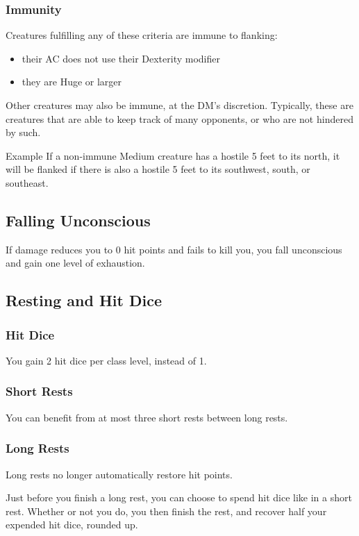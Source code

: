 \documentclass[letterpaper,twocolumn,openany,nodeprecatedcode]{dndbook}
\begin{document}
\subsubsection{Immunity}
Creatures fulfilling any of these criteria are immune to flanking:
\begin{itemize}
    \item their AC does not use their Dexterity modifier
    \item they are Huge or larger
\end{itemize}
Other creatures may also be immune, at the DM's discretion. Typically, these are creatures that are able to keep track of many opponents, or who are not hindered by such.

\begin{DndComment}{Example}
If a non-immune Medium creature has a hostile 5 feet to its north, it will be flanked if there is also a hostile 5 feet to its southwest, south, or southeast.
\end{DndComment}

\subsection{Falling Unconscious}
If damage reduces you to 0 hit points and fails to kill you, you fall unconscious and gain one level of exhaustion.

\subsection{Resting and Hit Dice}
\subsubsection{Hit Dice}
You gain 2 hit dice per class level, instead of 1.

\subsubsection{Short Rests}
You can benefit from at most three short rests between long rests.

\subsubsection{Long Rests}
Long rests no longer automatically restore hit points.

Just before you finish a long rest, you can choose to spend hit dice like in a short rest. Whether or not you do, you then finish the rest, and recover half your expended hit dice, rounded up.
\end{document}
